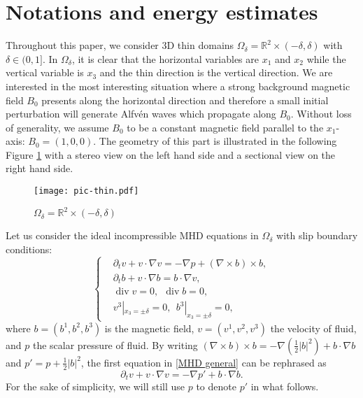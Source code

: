 \documentclass[10pt,reqno]{amsart}
\numberwithin{equation}{section}
\begin{document}
\section{Notations and 
energy estimates}\label{sec:notation} 
Throughout this paper, we consider 3D thin domains  $\Omega_{\delta}=\mathbb{R}^2\times(-\delta,\delta)$ with $\delta\in(0,1]$. 
In $\Omega_\delta$, it is clear that 
the horizontal variables are $x_1$ and $x_2$ while the vertical variable is $x_3$ and the thin direction is 
the  vertical direction. 
We are interested in the most interesting situation where a strong background magnetic field $B_0$ presents along the horizontal direction and therefore a small initial perturbation will generate Alfv\'en waves which propagate along $B_0$.  
Without loss of generality, we assume  $B_0$ to be a 
constant magnetic field  parallel to the $x_1$-axis: $B_0=(1,0,0)$. The geometry of this part is illustrated in the following Figure \ref{fig:Omegadelta} with a stereo 
view on the left hand side and a sectional view on the right hand side.  
 

\begin{figure}[ht]
		\vspace{-0.1cm}
	\centering
	\texttt{[image: pic-thin.pdf]}
	\vspace{-0.1cm}
	\caption{$\Omega_\delta=\mathbb{R}^2\times(-\delta,\delta)$}
	\label{fig:Omegadelta}
		\vspace{-0.1cm}
\end{figure}



Let us 
consider the ideal incompressible MHD equations in $\Omega_\delta$ with slip boundary conditions:
\begin{equation}\label{MHD general}
	\begin{cases}
		&\partial_t  v+ v\cdot \nabla v = -\nabla p + (\nabla\times b)\times b, \\
		&\partial_t b + v\cdot \nabla b =  b \cdot \nabla v,\\
		&\operatorname{div} v =0,\ \ 
		\operatorname{div} b =0,\\
		&v^3|_{x_3=\pm \delta}=0,\ \ b^3|_{x_3=\pm\delta}=0,
\end{cases}\end{equation}
where $b=(b^1,b^2,b^3)$ is the magnetic field, $v=(v^1,v^2,v^3)$  the velocity of fluid, and $p$  the scalar pressure of fluid. By  
writing $(\nabla\times b)\times b=-\nabla(\frac{1}{2}| b|^2)+b \cdot \nabla  b$ and  $p'=p+\frac{1}{2}|b|^2$, the first equation in \eqref{MHD general} can be rephrased as 
\[\partial_t  v+ v\cdot \nabla v = -\nabla p' + b \cdot \nabla b.\]
For the sake of simplicity, we will still use $p$ to denote $p'$ in what follows.
\end{document}

